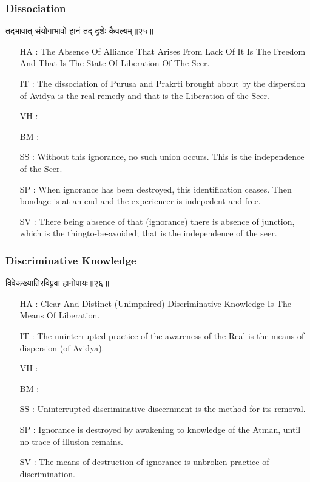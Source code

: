 \begin{frame}[fragile]\frametitle{Dissociation}
\begin{sanskrit}
तदभावात् संयोगाभावो हानं तद् दृशेः कैवल्यम्॥२५॥
\end{sanskrit}

	\begin{itemize}
	\item [HA]: The Absence Of Alliance That Arises From Lack Of It Is The Freedom And That Is The State Of Liberation Of The Seer.
	\item [IT]: The dissociation of Purusa and Prakrti brought about by the dispersion of Avidya is the real remedy and that is the Liberation of the Seer.
	\item [VH]: 
	\item [BM]: 
	\item [SS]: Without this ignorance, no such union occurs. This is the independence of the Seer.
	\item [SP]: When ignorance has been destroyed, this identification ceases. Then bondage is at an end and the experiencer is indepedent and free.
	\item [SV]: There being absence of that (ignorance) there is absence of junction, which is the thingto-be-avoided; that is the independence of the seer. 
	\end{itemize}
\end{frame}

\begin{frame}[fragile]\frametitle{Discriminative Knowledge}
\begin{sanskrit}
विवेकख्यातिरविप्लवा हानोपायः॥२६॥
\end{sanskrit}

	\begin{itemize}
	\item [HA]: Clear And Distinct (Unimpaired) Discriminative Knowledge Is The Means Of Liberation.
	\item [IT]: The uninterrupted practice of the awareness of the Real is the means of dispersion (of Avidya).
	\item [VH]: 
	\item [BM]: 
	\item [SS]: Uninterrupted discriminative discernment is the method for its removal.
	\item [SP]: Ignorance is destroyed by awakening to knowledge of the Atman, until no trace of illusion remains.
	\item [SV]: The means of destruction of ignorance is unbroken practice of discrimination. 
	\end{itemize}
\end{frame}

